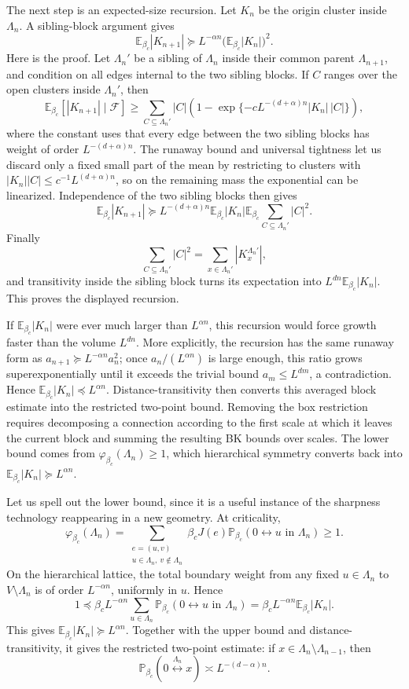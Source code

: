 \documentclass[11pt,reqno]{book}
\numberwithin{equation}{chapter}
\theoremstyle{plain}
\theoremstyle{definition}
\theoremstyle{remark}
\newcommand{\E}{\mathbb E}
\newcommand{\1}{\mathbf 1}
\newcommand{\pre}{\preceq}
\newcommand{\suc}{\succeq}
\begin{document}
The next step is an expected-size recursion. Let $K_n$ be the origin cluster inside $\Lambda_n$. A sibling-block argument gives
\[
  \E_{\beta_c}|K_{n+1}|
  \suc
  L^{-\alpha n}\bigl(\E_{\beta_c}|K_n|\bigr)^2.
\]
Here is the proof. Let \(\Lambda_n'\) be a sibling of \(\Lambda_n\) inside
their common parent \(\Lambda_{n+1}\), and condition on all edges internal
to the two sibling blocks. If \(C\) ranges over the open clusters inside
\(\Lambda_n'\), then
\[
  \E_{\beta_c}\!\left[|K_{n+1}|\mid \mathcal F\right]
  \geq
  \sum_{C\subseteq \Lambda_n'}
  |C|
  \left(1-\exp\{-cL^{-(d+\alpha)n}|K_n|\,|C|\}\right),
\]
where the constant uses that every edge between the two sibling blocks has
weight of order \(L^{-(d+\alpha)n}\). The runaway bound and universal
tightness let us discard only a fixed small part of the mean by restricting
to clusters with \(|K_n||C|\leq c^{-1}L^{(d+\alpha)n}\), so on the remaining
mass the exponential can be linearized. Independence of the two sibling
blocks then gives
\[
  \E_{\beta_c}|K_{n+1}|
  \suc
  L^{-(d+\alpha)n}
  \E_{\beta_c}|K_n|
  \E_{\beta_c}\sum_{C\subseteq\Lambda_n'}|C|^2 .
\]
Finally
\[
  \sum_{C\subseteq\Lambda_n'}|C|^2
  =
  \sum_{x\in\Lambda_n'}|K_x^{\Lambda_n'}|,
\]
and transitivity inside the sibling block turns its expectation into
\(L^{dn}\E_{\beta_c}|K_n|\). This proves the displayed recursion.

If $\E_{\beta_c}|K_n|$ were ever much larger than $L^{\alpha n}$, this recursion would force growth faster than the volume $L^{dn}$. More explicitly, the recursion has the same runaway form as \(a_{n+1}\suc L^{-\alpha n}a_n^2\); once \(a_n/(L^{\alpha n})\) is large enough, this ratio grows superexponentially until it exceeds the trivial bound \(a_m\leq L^{dm}\), a contradiction. Hence $\E_{\beta_c}|K_n|\pre L^{\alpha n}$. Distance-transitivity then converts this averaged block estimate into the restricted two-point bound. Removing the box restriction requires decomposing a connection according to the first scale at which it leaves the current block and summing the resulting BK bounds over scales. The lower bound comes from $\varphi_{\beta_c}(\Lambda_n)\geq1$, which hierarchical symmetry converts back into $\E_{\beta_c}|K_n|\suc L^{\alpha n}$.

Let us spell out the lower bound, since it is a useful instance of the sharpness technology reappearing in a new geometry. At criticality,
\[
  \varphi_{\beta_c}(\Lambda_n)
  =
  \sum_{\substack{e=(u,v)\\ u\in\Lambda_n,\ v\notin\Lambda_n}}
  \beta_c J(e)
  \mathbb P_{\beta_c}(0\leftrightarrow u\text{ in }\Lambda_n)
  \geq1.
\]
On the hierarchical lattice, the total boundary weight from any fixed \(u\in\Lambda_n\) to \(V\setminus\Lambda_n\) is of order \(L^{-\alpha n}\), uniformly in \(u\). Hence
\[
  1
  \pre
  \beta_c L^{-\alpha n}
  \sum_{u\in\Lambda_n}
  \mathbb P_{\beta_c}(0\leftrightarrow u\text{ in }\Lambda_n)
  =
  \beta_c L^{-\alpha n}\E_{\beta_c}|K_n|.
\]
This gives \(\E_{\beta_c}|K_n|\suc L^{\alpha n}\). Together with the upper
bound and distance-transitivity, it gives the restricted two-point estimate:
if \(x\in\Lambda_n\setminus\Lambda_{n-1}\), then
\[
  \mathbb P_{\beta_c}(0\stackrel{\Lambda_n}{\longleftrightarrow}x)
  \asymp
  L^{-(d-\alpha)n}.
\]
\end{document}
